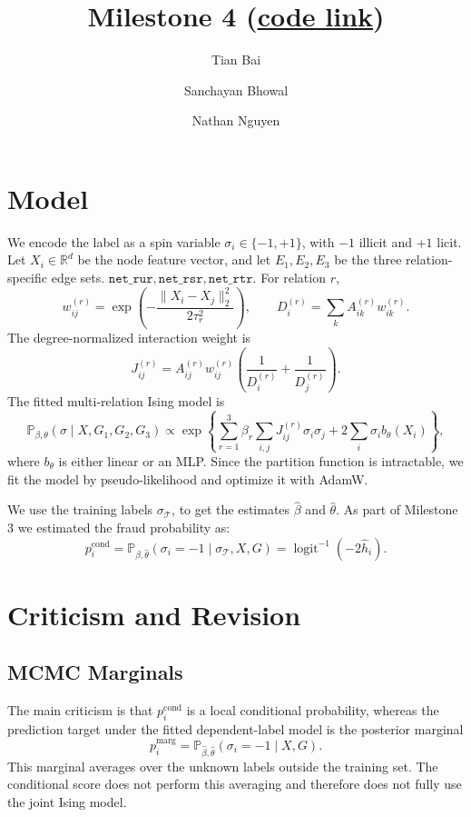 \documentclass[10pt,reqno]{amsart}
\title{Milestone 4 (\href{https://github.com/Sanchayan-Bhowal/BitcoinTransactionClassification}{code link})}
\author{Tian Bai \and Sanchayan Bhowal \and Nathan Nguyen}
\date{}
\newcommand{\Pbb}{\mathbb P}
\newcommand{\T}{\mathcal T}
\begin{document}
\maketitle
\vspace{-1.2em}

\section{Model}
We encode the label as a spin variable $\sigma_i \in \{-1,+1\}$, with $-1$ illicit and $+1$ licit. Let $X_i \in \mathbb{R}^d$ be the node feature vector, and let $E_1, E_2, E_3$ be the three relation-specific edge sets.
$\texttt{net\_rur},\texttt{net\_rsr},\texttt{net\_rtr}$.  For relation $r$,
\[
    w_{ij}^{(r)}
    =
    \exp\left(-\frac{\|X_i-X_j\|_2^2}{2\tau_r^2}\right),
    \qquad
    D_i^{(r)}=\sum_k A_{ik}^{(r)}w_{ik}^{(r)}.
\]
The degree-normalized interaction weight is
\[
    J_{ij}^{(r)}
    =
    A_{ij}^{(r)}w_{ij}^{(r)}
    \left(\frac{1}{D_i^{(r)}}+\frac{1}{D_j^{(r)}}\right).
\]
The fitted multi-relation Ising model is
\[
\Pbb_{\beta,\theta}(\sigma\mid X,G_1,G_2,G_3)
\propto
\exp\left\{
    \sum_{r=1}^3\beta_r\sum_{i,j}J_{ij}^{(r)}\sigma_i\sigma_j
    +
    2\sum_i\sigma_i b_\theta(X_i)
\right\},
\]
where $b_\theta$ is either linear or an MLP. Since the partition function is
intractable, we fit the model by pseudo-likelihood and optimize it with AdamW.

We use the training labels $\sigma_{\T}$, to get the estimates $\hat{\beta}$ and $\hat{\theta}$. As part of Milestone 3 we estimated the fraud probability as:
\[
    p_i^{\mathrm{cond}}
    =
    \Pbb_{\widehat\beta,\widehat\theta}(\sigma_i=-1\mid \sigma_\T,X,G)
    =
    \operatorname{logit}^{-1}(-2\widehat h_i).
\]

\section{Criticism and Revision}
\subsection{MCMC Marginals}
\label{sec:crit1}

The main criticism is that $p_i^{\mathrm{cond}}$ is a local conditional
probability, whereas the prediction target under the fitted dependent-label
model is the posterior marginal
\[
    p_i^{\mathrm{marg}}
    =
    \Pbb_{\widehat\beta,\widehat\theta}(\sigma_i=-1\mid X,G).
\]
This marginal averages over the unknown labels outside the training set. The
conditional score does not perform this averaging and therefore does not fully
use the joint Ising model.
\end{document}
